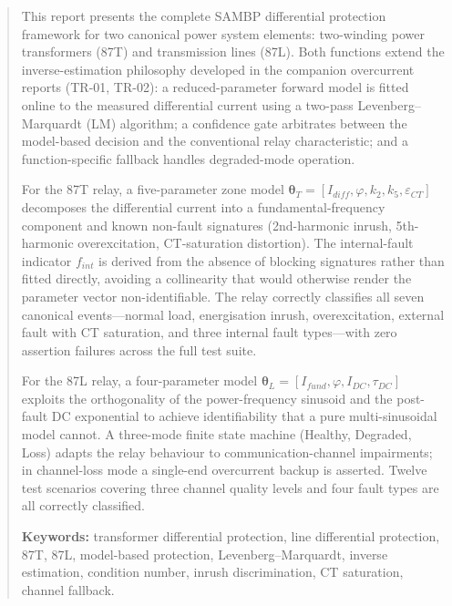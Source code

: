 \documentclass[12pt,a4paper]{article}
\newcommand{\thetaT}{\boldsymbol{\theta}_T}
\newcommand{\thetaL}{\boldsymbol{\theta}_L}
\newcommand{\Idc}{I_{DC}}
\begin{document}
\begin{abstract}
\noindent
This report presents the complete SAMBP differential protection framework
for two canonical power system elements: two-winding power transformers
(87T) and transmission lines (87L).  Both functions extend the
inverse-estimation philosophy developed in the companion overcurrent reports
(TR-01, TR-02): a reduced-parameter forward model is fitted online to the
measured differential current using a two-pass Levenberg--Marquardt (LM)
algorithm; a confidence gate arbitrates between the model-based decision and
the conventional relay characteristic; and a function-specific fallback
handles degraded-mode operation.

For the 87T relay, a five-parameter zone model
$\thetaT = [I_{diff}, \varphi, k_2, k_5, \varepsilon_{CT}]$
decomposes the differential current into a fundamental-frequency component
and known non-fault signatures (2nd-harmonic inrush, 5th-harmonic
overexcitation, CT-saturation distortion).  The internal-fault indicator
$f_{int}$ is derived from the absence of blocking signatures rather than
fitted directly, avoiding a collinearity that would otherwise render the
parameter vector non-identifiable.  The relay correctly classifies all
seven canonical events---normal load, energisation inrush, overexcitation,
external fault with CT saturation, and three internal fault types---with
zero assertion failures across the full test suite.

For the 87L relay, a four-parameter model
$\thetaL = [I_{fund}, \varphi, \Idc, \tau_{DC}]$
exploits the orthogonality of the power-frequency sinusoid and the
post-fault DC exponential to achieve identifiability that a pure
multi-sinusoidal model cannot.  A three-mode finite state machine (Healthy,
Degraded, Loss) adapts the relay behaviour to communication-channel
impairments; in channel-loss mode a single-end overcurrent backup is
asserted.  Twelve test scenarios covering three channel quality levels and
four fault types are all correctly classified.

\medskip\noindent
\textbf{Keywords:} transformer differential protection, line differential
protection, 87T, 87L, model-based protection, Levenberg--Marquardt, inverse
estimation, condition number, inrush discrimination, CT saturation, channel
fallback.
\end{abstract}

\newpage
\tableofcontents
\listoffigures
\listoftables
\newpage
\end{document}
